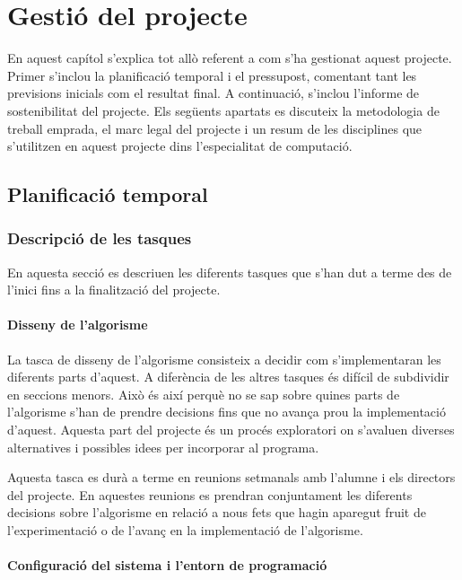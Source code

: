 \chapter{Gestió del projecte}

En aquest capítol s'explica tot allò referent a com s'ha gestionat aquest projecte. Primer s'inclou la planificació temporal i el pressupost, comentant tant les previsions inicials com el resultat final. A continuació, s'inclou l'informe de sostenibilitat del projecte. Els següents apartats es discuteix la metodologia de treball emprada, el marc legal del projecte i un resum de les disciplines que s'utilitzen en aquest projecte dins l'especialitat de computació.

\section{Planificació temporal}

\subsection{Descripció de les tasques}

En aquesta secció es descriuen les diferents tasques que s'han dut a terme des de l'inici fins a la finalització del projecte. 

\subsubsection{Disseny de l'algorisme}

La tasca de disseny de l'algorisme consisteix a decidir com s'implementaran les diferents parts d'aquest. A diferència de les altres tasques és difícil de subdividir en seccions menors. Això és així perquè no se sap sobre quines parts de l'algorisme s'han de prendre decisions fins que no avança prou la implementació d'aquest. Aquesta part del projecte és un procés exploratori on s'avaluen diverses alternatives i possibles idees per incorporar al programa.

Aquesta tasca es durà a terme en reunions setmanals amb l'alumne i els directors del projecte. En aquestes reunions es prendran conjuntament les diferents decisions sobre l'algorisme en relació a nous fets que hagin aparegut fruit de l'experimentació o de l'avanç en la implementació de l'algorisme.

\subsubsection{Configuració del sistema i l'entorn de programació}

